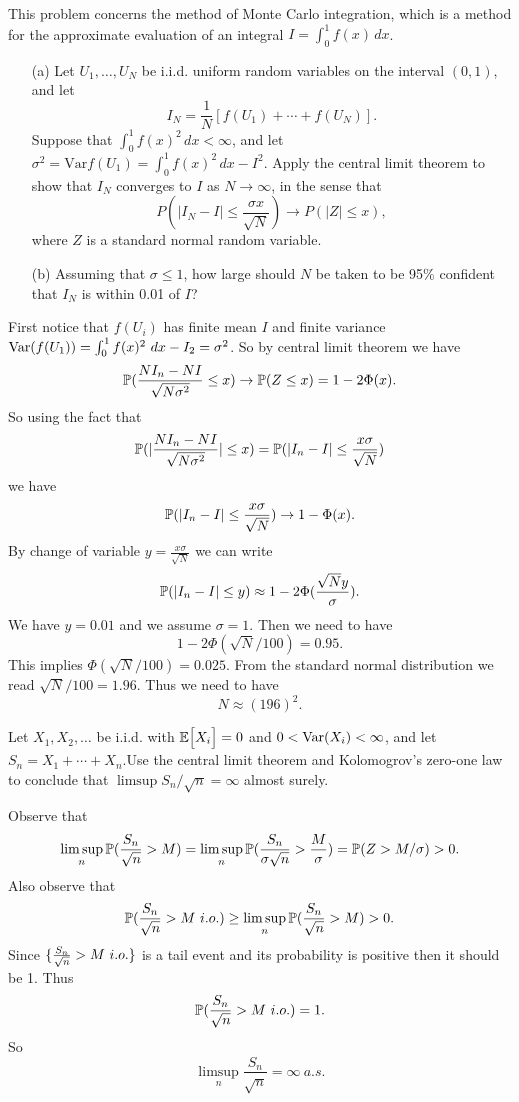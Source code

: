 \begin{problem}
	This problem concerns the method of Monte Carlo integration, which is a method for the approximate evaluation of an integral \( I = \int_0^1 f(x) \, dx \).
	
	\begin{itemize}
		\item[(a)] Let \( U_1, \dots, U_N \) be i.i.d. uniform random variables on the interval \( (0,1) \), and let
		\[
		I_N = \frac{1}{N} \left[ f(U_1) + \cdots + f(U_N) \right].
		\]
		Suppose that \( \int_0^1 f(x)^2 \, dx < \infty \), and let \( \sigma^2 = \text{Var} f(U_1) = \int_0^1 f(x)^2 \, dx - I^2 \). Apply the central limit theorem to show that \( I_N \) converges to \( I \) as \( N \to \infty \), in the sense that
		\[
		P\left( \left| I_N - I \right| \leq \frac{\sigma x}{\sqrt{N}} \right) \to P(|Z| \leq x),
		\]
		where \( Z \) is a standard normal random variable.
		
		\item[(b)] Assuming that \( \sigma \leq 1 \), how large should \( N \) be taken to be 95\% confident that \( I_N \) is within 0.01 of \( I \)?
	\end{itemize}
\end{problem}
\begin{solution}
	First notice that $ f(U_i) $ has finite mean $ I $ and finite variance $ \operatorname{Var}(f(U_1)) = \int_{0}^{1}f(x)^2\ dx - I_2 = \sigma^2 $. So by central limit theorem we have
	\[ \mathbb{P}(\frac{NI_n - NI}{\sqrt{N\sigma^2}} \leq x) \to \mathbb{P}(Z \leq x) = 1-2\Phi(x). \] 
	So using the fact that
	\[ \mathbb{P}(|\frac{NI_n - NI}{\sqrt{N\sigma^2}}| \leq x) = \mathbb{P}(|I_n - I| \leq \frac{x\sigma}{\sqrt{N}})\]
	we have
	\[ \mathbb{P}(|I_n - I| \leq \frac{x\sigma}{\sqrt{N}}) \to 1 - \Phi(x). \]
	By change of variable $ y = \frac{x\sigma}{\sqrt{N}} $ we can write
	\[ \mathbb{P}(|I_n - I| \leq y) \approx 1 - 2\Phi(\frac{\sqrt{N}y}{\sigma}). \]
	We have $ y = 0.01 $ and we assume $ \sigma = 1 $. Then we need to have
	\[ 1 - 2 \Phi(\sqrt{N}/100) = 0.95. \]
	This implies $ \Phi(\sqrt{N}/100) = 0.025 $. From the standard normal distribution we read $ \sqrt{N}/100 = 1.96 $. Thus we need to have
	\[ N \approx (196)^2. \]
\end{solution}


\begin{problem}
	Let $ X_1,X_2,\dots $ be i.i.d. with $ \mathbb{E}\big[X_i\big] = 0 $ and $ 0 < \operatorname{Var}(X_i)<\infty $, and let $ S_n = X_1 + \cdots + X_n $.Use the central limit theorem and Kolomogrov's zero-one law to conclude that $ \limsup S_n/\sqrt{n} = \infty $ almost surely.
\end{problem}
\begin{solution}
	Observe that 
	\[ \limsup_n \mathbb{P}(\frac{S_n}{\sqrt{n}} > M) = \limsup_n \mathbb{P}(\frac{S_n}{\sigma\sqrt{n}} > \frac{M}{\sigma}) = \mathbb{P}(Z>M/\sigma) > 0. \]
	Also observe that 
	\[ \mathbb{P}(\frac{S_n}{\sqrt{n}} > M\ i.o.) \geq \limsup_n \mathbb{P}(\frac{S_n}{\sqrt{n}} > M) > 0. \]
	Since $ \set{\frac{S_n}{\sqrt{n}} > M\ i.o.} $ is a tail event and its probability is positive then it should be 1. Thus
	\[ \mathbb{P}(\frac{S_n}{\sqrt{n}} > M\ i.o.) = 1. \]
	So 
	\[ \limsup_n \frac{S_n}{\sqrt{n}} = \infty \ a.s. \]
\end{solution}

